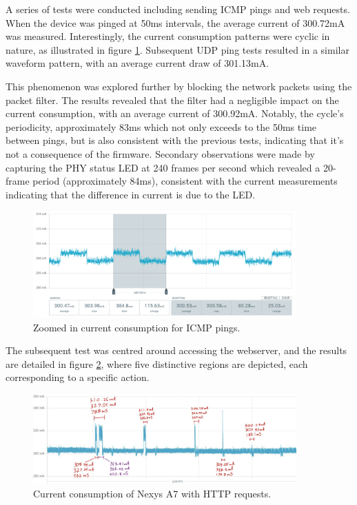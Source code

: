 A series of tests were conducted including sending ICMP pings and web requests. When the device was pinged at 50ms intervals, the average current of 300.72mA was measured. Interestingly, the current consumption patterns were cyclic in nature, as illustrated in figure \ref{fig:ppk_icmp_ping}. Subsequent UDP ping tests resulted in a similar waveform pattern, with an average current draw of 301.13mA.

This phenomenon was explored further by blocking the network packets using the packet filter. The results revealed that the filter had a negligible impact on the current consumption, with an average current of 300.92mA. Notably, the cycle's periodicity, approximately 83ms which not only exceeds to the 50ms time between pings, but is also consistent with the previous tests, indicating that it's not a consequence of the firmware. Secondary observations were made by capturing the PHY status LED at 240 frames per second which revealed a 20-frame period (approximately 84ms), consistent with the current measurements indicating that the difference in current is due to the LED.


\begin{figure}[h]
    \centering
    \includegraphics[width=0.9\textwidth]{Images/PPK_ping_zoom.png}
    \caption[Zoomed in current consumption for ICMP pings]{Zoomed in current consumption for ICMP pings.}
    \label{fig:ppk_icmp_ping}
\end{figure}

The subsequent test was centred around accessing the webserver, and the results are detailed in figure \ref{fig:ppk_http_annotated}, where five distinctive regions are depicted, each corresponding to a specific action.



\begin{figure}[h]
    \centering
    \includegraphics[width=0.9\textwidth]{Images/PPK_http_annotated.png}
    \caption[Current consumption of Nexys A7 with HTTP requests]{Current consumption of Nexys A7 with HTTP requests.}
    \label{fig:ppk_http_annotated}
\end{figure}


